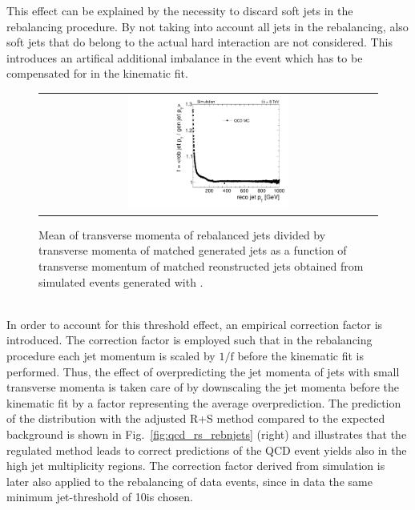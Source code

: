 This effect can be explained by the necessity to discard soft jets in the rebalancing procedure. By not taking into account all jets in the rebalancing, also soft jets that do belong to the actual hard interaction are not considered. This introduces an artifical additional imbalance in the event which has to be compensated for in the kinematic fit. 
\begin{figure}[!t]
  \centering
  \begin{tabular}{c}
                \includegraphics[width=0.49\textwidth]{figures/RebalanceCorrectionFactors_DR53X_chsJets_TuneZ2star_withoutPUReweighting_pt10_vsRecoMadgraph.pdf} 
  \end{tabular}
  \caption{Mean of transverse momenta of rebalanced jets divided by transverse momenta of matched generated jets as a function of transverse momentum of matched reonstructed jets obtained from simulated events generated with \madgraph.}
  \label{fig:qcd_rs_rebfactor}
\end{figure}
\\
In order to account for this threshold effect, an empirical correction factor is introduced. The correction factor is employed such that in the rebalancing procedure each jet momentum is scaled by $1/\mathrm{f}$ before the kinematic fit is performed. Thus, the effect of overpredicting the jet momenta of jets with small transverse momenta is taken care of by downscaling the jet momenta before the kinematic fit by a factor representing the average overprediction. The prediction of the \NJets distribution with the adjusted R+S method compared to the expected background is shown in Fig.~\ref{fig:qcd_rs_rebnjets} (right) and illustrates that the regulated method leads to correct predictions of the QCD event yields also in the high jet multiplicity regions. The correction factor derived from simulation is later also applied to the rebalancing of data events, since in data the same minimum jet-\pt threshold of 10\gev is chosen.%
